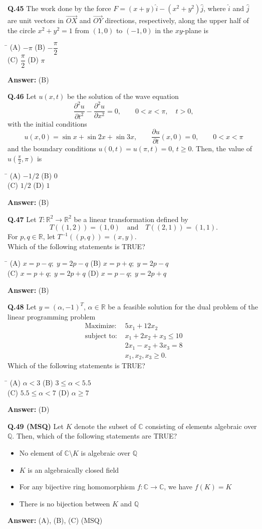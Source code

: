 \documentclass[11pt,a4paper]{article}
\newcommand{\optsfourA}[4]{%
  \begin{tabbing}
    \hspace{0.48\linewidth}\=\kill
    (A) #1 \> (B) #2 \\[2pt]
    (C) #3 \> (D) #4
  \end{tabbing}%
}
\newcommand{\optslistA}[4]{%
  \begin{itemize}
    \setlength{\itemsep}{2pt}\setlength{\parskip}{0pt}
    \item[(A)] #1
    \item[(B)] #2
    \item[(C)] #3
    \item[(D)] #4
  \end{itemize}%
}
\newcommand{\ans}[1]{\textbf{Answer:} #1\par\medskip}
\begin{document}
\textbf{Q.45} The work done by the force $F = (x + y)\hat{i} - (x^2 + y^2)\hat{j}$, where $\hat{i}$ and $\hat{j}$ are unit vectors in $\overrightarrow{OX}$ and $\overrightarrow{OY}$ directions, respectively, along the upper half of the circle $x^2 + y^2 = 1$ from $(1, 0)$ to $(-1, 0)$ in the $xy$-plane is
\optsfourA{$-\pi$}{$-\dfrac{\pi}{2}$}{$\dfrac{\pi}{2}$}{$\pi$}
\ans{(B)}

\textbf{Q.46} Let $u(x, t)$ be the solution of the wave equation
\[
  \frac{\partial^2 u}{\partial t^2} - \frac{\partial^2 u}{\partial x^2} = 0, \qquad 0 < x < \pi,\quad t > 0,
\]
with the initial conditions
\[
  u(x, 0) = \sin x + \sin 2x + \sin 3x, \qquad \frac{\partial u}{\partial t}(x, 0) = 0, \qquad 0 < x < \pi
\]
and the boundary conditions $u(0, t) = u(\pi, t) = 0$, $t \ge 0$. Then, the value of $u\!\left(\frac{\pi}{2}, \pi\right)$ is
\optsfourA{$-1/2$}{$0$}{$1/2$}{$1$}
\ans{(B)}

\textbf{Q.47} Let $T : \mathbb{R}^2 \to \mathbb{R}^2$ be a linear transformation defined by
\[
  T((1, 2)) = (1, 0) \quad \text{and} \quad T((2, 1)) = (1, 1).
\]
For $p, q \in \mathbb{R}$, let $T^{-1}((p, q)) = (x, y)$.\\
Which of the following statements is TRUE?
\optsfourA{$x = p - q;\; y = 2p - q$}{$x = p + q;\; y = 2p - q$}{$x = p + q;\; y = 2p + q$}{$x = p - q;\; y = 2p + q$}
\ans{(B)}

\textbf{Q.48} Let $y = (\alpha, -1)^T$, $\alpha \in \mathbb{R}$ be a feasible solution for the dual problem of the linear programming problem
\begin{align*}
  \text{Maximize: } & 5x_1 + 12x_2 \\
  \text{subject to: } & x_1 + 2x_2 + x_3 \le 10 \\
                      & 2x_1 - x_2 + 3x_3 = 8 \\
                      & x_1, x_2, x_3 \ge 0.
\end{align*}
Which of the following statements is TRUE?
\optsfourA{$\alpha < 3$}{$3 \le \alpha < 5.5$}{$5.5 \le \alpha < 7$}{$\alpha \ge 7$}
\ans{(D)}

\textbf{Q.49 (MSQ)} Let $K$ denote the subset of $\mathbb{C}$ consisting of elements algebraic over $\mathbb{Q}$. Then, which of the following statements are TRUE?
\optslistA{No element of $\mathbb{C} \setminus K$ is algebraic over $\mathbb{Q}$}{$K$ is an algebraically closed field}{For any bijective ring homomorphism $f : \mathbb{C} \to \mathbb{C}$, we have $f(K) = K$}{There is no bijection between $K$ and $\mathbb{Q}$}
\ans{(A), (B), (C) (MSQ)}
\end{document}
